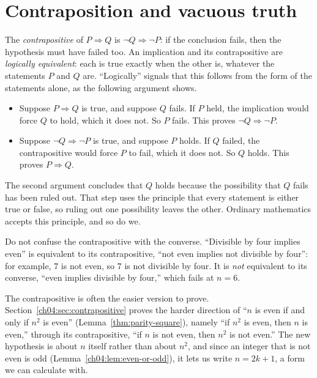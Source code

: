 \section{Contraposition and vacuous truth}\label{ch02:sec:contrapositive}
The \emph{contrapositive} of $P\Rightarrow Q$ is $\neg Q\Rightarrow\neg P$: if the conclusion fails, then the hypothesis must have failed too. An implication and its contrapositive are \emph{logically equivalent}: each is true exactly when the other is, whatever the statements $P$ and $Q$ are. ``Logically'' signals that this follows from the form of the statements alone, as the following argument shows.
\begin{itemize}
\item Suppose $P\Rightarrow Q$ is true, and suppose $Q$ fails. If $P$ held, the implication would force $Q$ to hold, which it does not. So $P$ fails. This proves $\neg Q\Rightarrow\neg P$.
\item Suppose $\neg Q\Rightarrow\neg P$ is true, and suppose $P$ holds. If $Q$ failed, the contrapositive would force $P$ to fail, which it does not. So $Q$ holds. This proves $P\Rightarrow Q$.
\end{itemize}
The second argument concludes that $Q$ holds because the possibility that $Q$ fails has been ruled out. That step uses the principle that every statement is either true or false, so ruling out one possibility leaves the other. Ordinary mathematics accepts this principle, and so do we.


Do not confuse the contrapositive with the converse. ``Divisible by four implies even'' is equivalent to its contrapositive, ``not even implies not divisible by four'': for example, $7$ is not even, so $7$ is not divisible by four. It is \emph{not} equivalent to its converse, ``even implies divisible by four,'' which fails at $n=6$.

The contrapositive is often the easier version to prove. Section~\ref{ch04:sec:contrapositive} proves the harder direction of ``$n$ is even if and only if $n^2$ is even'' (Lemma~\ref{thm:parity-square}), namely ``if $n^2$ is even, then $n$ is even,'' through its contrapositive, ``if $n$ is not even, then $n^2$ is not even.'' The new hypothesis is about $n$ itself rather than about $n^2$, and since an integer that is not even is odd (Lemma~\ref{ch04:lem:even-or-odd}), it lets us write $n=2k+1$, a form we can calculate with.

